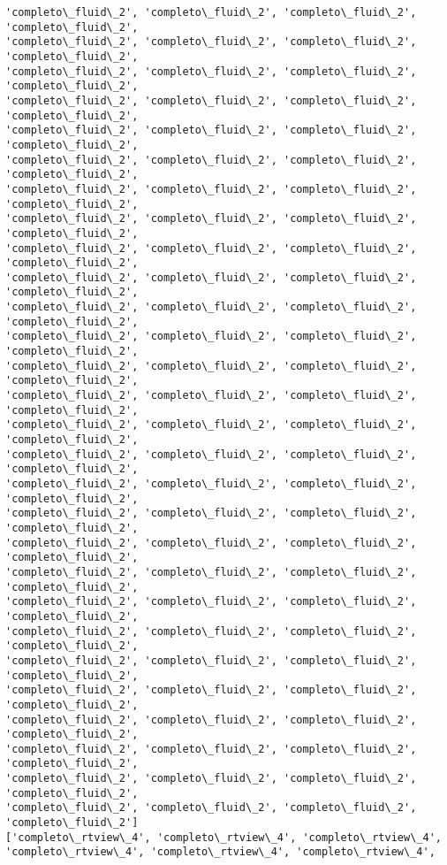 \documentclass[11pt]{article}
\begin{document}
\begin{Verbatim}[commandchars=\\\{\}]
'completo\_fluid\_2', 'completo\_fluid\_2', 'completo\_fluid\_2', 'completo\_fluid\_2',
'completo\_fluid\_2', 'completo\_fluid\_2', 'completo\_fluid\_2', 'completo\_fluid\_2',
'completo\_fluid\_2', 'completo\_fluid\_2', 'completo\_fluid\_2', 'completo\_fluid\_2',
'completo\_fluid\_2', 'completo\_fluid\_2', 'completo\_fluid\_2', 'completo\_fluid\_2',
'completo\_fluid\_2', 'completo\_fluid\_2', 'completo\_fluid\_2', 'completo\_fluid\_2',
'completo\_fluid\_2', 'completo\_fluid\_2', 'completo\_fluid\_2', 'completo\_fluid\_2',
'completo\_fluid\_2', 'completo\_fluid\_2', 'completo\_fluid\_2', 'completo\_fluid\_2',
'completo\_fluid\_2', 'completo\_fluid\_2', 'completo\_fluid\_2', 'completo\_fluid\_2',
'completo\_fluid\_2', 'completo\_fluid\_2', 'completo\_fluid\_2', 'completo\_fluid\_2',
'completo\_fluid\_2', 'completo\_fluid\_2', 'completo\_fluid\_2', 'completo\_fluid\_2',
'completo\_fluid\_2', 'completo\_fluid\_2', 'completo\_fluid\_2', 'completo\_fluid\_2',
'completo\_fluid\_2', 'completo\_fluid\_2', 'completo\_fluid\_2', 'completo\_fluid\_2',
'completo\_fluid\_2', 'completo\_fluid\_2', 'completo\_fluid\_2', 'completo\_fluid\_2',
'completo\_fluid\_2', 'completo\_fluid\_2', 'completo\_fluid\_2', 'completo\_fluid\_2',
'completo\_fluid\_2', 'completo\_fluid\_2', 'completo\_fluid\_2', 'completo\_fluid\_2',
'completo\_fluid\_2', 'completo\_fluid\_2', 'completo\_fluid\_2', 'completo\_fluid\_2',
'completo\_fluid\_2', 'completo\_fluid\_2', 'completo\_fluid\_2', 'completo\_fluid\_2',
'completo\_fluid\_2', 'completo\_fluid\_2', 'completo\_fluid\_2', 'completo\_fluid\_2',
'completo\_fluid\_2', 'completo\_fluid\_2', 'completo\_fluid\_2', 'completo\_fluid\_2',
'completo\_fluid\_2', 'completo\_fluid\_2', 'completo\_fluid\_2', 'completo\_fluid\_2',
'completo\_fluid\_2', 'completo\_fluid\_2', 'completo\_fluid\_2', 'completo\_fluid\_2',
'completo\_fluid\_2', 'completo\_fluid\_2', 'completo\_fluid\_2', 'completo\_fluid\_2',
'completo\_fluid\_2', 'completo\_fluid\_2', 'completo\_fluid\_2', 'completo\_fluid\_2',
'completo\_fluid\_2', 'completo\_fluid\_2', 'completo\_fluid\_2', 'completo\_fluid\_2',
'completo\_fluid\_2', 'completo\_fluid\_2', 'completo\_fluid\_2', 'completo\_fluid\_2',
'completo\_fluid\_2', 'completo\_fluid\_2', 'completo\_fluid\_2', 'completo\_fluid\_2',
'completo\_fluid\_2', 'completo\_fluid\_2', 'completo\_fluid\_2', 'completo\_fluid\_2',
'completo\_fluid\_2', 'completo\_fluid\_2', 'completo\_fluid\_2', 'completo\_fluid\_2']
['completo\_rtview\_4', 'completo\_rtview\_4', 'completo\_rtview\_4',
'completo\_rtview\_4', 'completo\_rtview\_4', 'completo\_rtview\_4',

\end{Verbatim}
\end{document}
